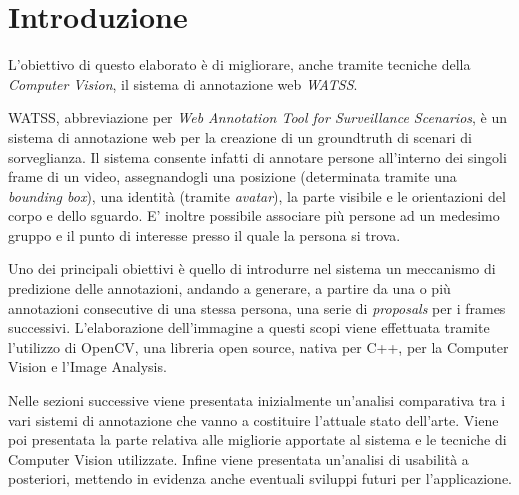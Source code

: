 \chapter*{Introduzione}

L'obiettivo di questo elaborato è di migliorare, anche tramite tecniche della \emph{Computer Vision}, il sistema di annotazione web \emph{WATSS}\cite{Bartoli:2015:WWA:2733373.2807411}.

WATSS, abbreviazione per \emph{Web Annotation Tool for Surveillance Scenarios}, è un sistema di annotazione web per la creazione di un groundtruth di scenari di sorveglianza. Il sistema consente infatti di annotare persone all'interno dei singoli frame di un video, assegnandogli una posizione (determinata tramite una \emph{bounding box}), una identità (tramite \emph{avatar}), la parte visibile e le orientazioni del corpo e dello sguardo. E' inoltre possibile associare più persone ad un medesimo gruppo e il punto di interesse presso il quale la persona si trova.

Uno dei principali obiettivi è quello di introdurre nel sistema un meccanismo di predizione delle annotazioni, andando a generare, a partire da una o più annotazioni consecutive di una stessa persona, una serie di \emph{proposals} per i frames successivi. 
L'elaborazione dell'immagine a questi scopi viene effettuata tramite l'utilizzo di OpenCV, una libreria open source, nativa per C++, per la Computer Vision e l'Image Analysis.

Nelle sezioni successive viene presentata inizialmente un'analisi comparativa tra i vari sistemi di annotazione che vanno a costituire l'attuale stato dell'arte. Viene poi presentata la parte relativa alle migliorie apportate al sistema e le tecniche di Computer Vision utilizzate. Infine viene presentata un'analisi di usabilità a posteriori, mettendo in evidenza anche eventuali sviluppi futuri per l'applicazione.
